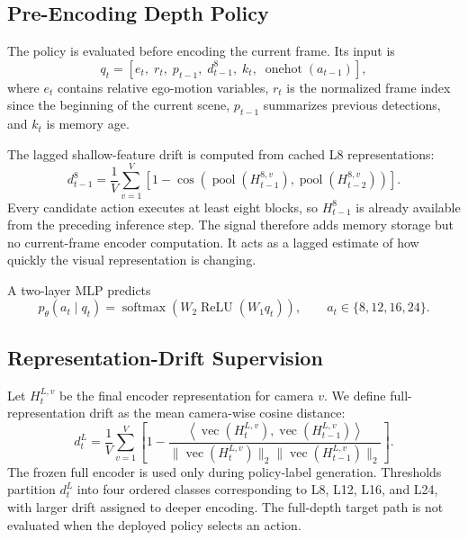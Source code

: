 \documentclass[10pt,twocolumn,letterpaper]{article}
\begin{document}


\subsection{Pre-Encoding Depth Policy}

The policy is evaluated before encoding the current frame. Its input
is
\begin{equation}
q_t =
\left[
e_t,\;
r_t,\;
p_{t-1},\;
d_{t-1}^{8},\;
k_t,\;
\operatorname{onehot}(a_{t-1})
\right],
\end{equation}
where $e_t$ contains relative ego-motion variables, $r_t$ is the
normalized frame index since the beginning of the current scene,
$p_{t-1}$ summarizes previous detections, and $k_t$ is memory age.

The lagged shallow-feature drift is computed from cached L8
representations:
\begin{equation}
d_{t-1}^{8}
=
\frac{1}{V}\sum_{v=1}^{V}
\left[
1-
\cos\!\left(
\operatorname{pool}(H_{t-1}^{8,v}),
\operatorname{pool}(H_{t-2}^{8,v})
\right)
\right].
\end{equation}
Every candidate action executes at least eight blocks, so
$H_{t-1}^{8}$ is already available from the preceding inference
step. The signal therefore adds memory storage but no current-frame
encoder computation. It acts as a lagged estimate of how quickly the
visual representation is changing.

A two-layer MLP predicts
\begin{equation}
p_\theta(a_t\mid q_t)
=
\operatorname{softmax}
\left(
W_2\operatorname{ReLU}(W_1q_t)
\right),
\qquad
a_t\in\{8,12,16,24\}.
\end{equation}

\subsection{Representation-Drift Supervision}

Let $H_t^{L,v}$ be the final encoder representation for camera $v$.
We define full-representation drift as the mean camera-wise cosine
distance:
\begin{equation}
d_t^{L}
=
\frac{1}{V}\sum_{v=1}^{V}
\left[
1-
\frac{
\left\langle
\operatorname{vec}(H_t^{L,v}),
\operatorname{vec}(H_{t-1}^{L,v})
\right\rangle
}{
\|\operatorname{vec}(H_t^{L,v})\|_2
\|\operatorname{vec}(H_{t-1}^{L,v})\|_2
}
\right].
\end{equation}
The frozen full encoder is used only during policy-label generation.
Thresholds partition $d_t^L$ into four ordered classes corresponding
to L8, L12, L16, and L24, with larger drift assigned to deeper
encoding. The full-depth target path is not evaluated when the
deployed policy selects an action.
\end{document}
